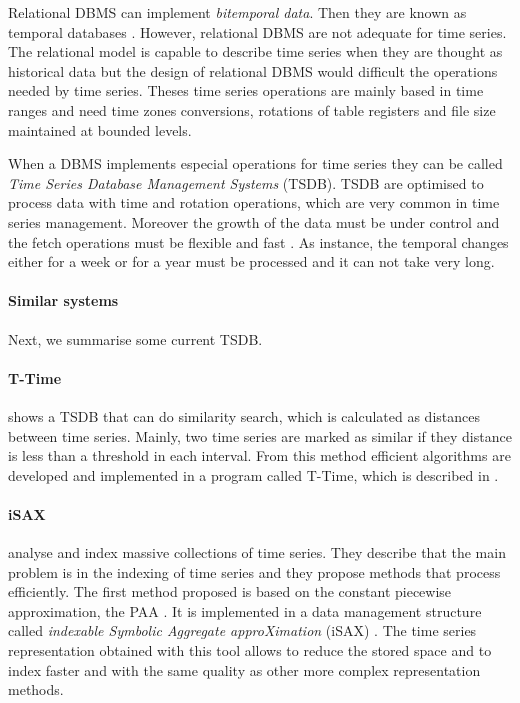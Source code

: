 Relational DBMS can implement \emph{bitemporal data}. Then they are known as temporal databases \parencite[ch.\ 22]{date}. However, relational DBMS are not adequate for time series. The relational model is capable to describe time series when they are thought as historical data but the design of relational DBMS would difficult the operations  needed by time series. Theses time series operations are mainly based in time ranges and need time zones conversions, rotations of table registers and file size maintained at bounded levels.

When a DBMS implements especial operations for time series they can be called \emph{Time Series Database Management Systems} (TSDB). TSDB are optimised to process data with time and rotation operations, which are very common in time series management. Moreover the growth of the data must be under control and the fetch operations must be flexible and fast \parencite{keogh10:isax}. As instance, the temporal changes either for a week or for a year must be processed and it can not take very long.




\paragraph{Similar systems} Next, we summarise some current TSDB.

\paragraph{T-Time}  \textcite{assfalg08:thesis} shows a TSDB that can do similarity search, which is calculated as distances between time series. Mainly, two time series are marked as similar if they distance is less than a threshold in each interval. From this method efficient algorithms are developed and implemented in a program called T-Time, which is described in \cite{assfalg08:ttime}.

 
\paragraph{iSAX} \textcite{keogh08:isax,keogh10:isax} analyse and index massive collections of time series. They describe that the main problem is in the indexing of time series and they propose methods that process efficiently. The first method proposed is based on the constant piecewise approximation, the PAA \parencite{keogh00}. It is implemented in a data management structure called \emph{indexable Symbolic Aggregate approXimation} (iSAX) \parencite{isax}. The time series representation obtained with this tool allows to reduce the stored space and to index faster and with the same quality as other more complex representation methods.
 

